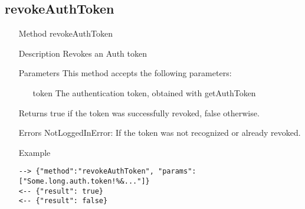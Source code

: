 \documentclass[a4paper]{scrreprt}
\begin{document}
\subsection{revokeAuthToken}
\begin{enumerate}
\item[Method] revokeAuthToken
\item[Description] Revokes an Auth token
\item[Parameters] This method accepts the following parameters:
	\begin{enumerate}
		\item[token] The authentication token, obtained with getAuthToken
    \end{enumerate}
\item[Returns] true if the token was successfully revoked, false otherwise.
\item[Errors] NotLoggedInError: If the token was not recognized or already revoked.
\item[Example]
\begin{lstlisting}
--> {"method":"revokeAuthToken", "params":["Some.long.auth.token!%&..."]}
<-- {"result": true}
<-- {"result": false}
\end{lstlisting}
\end{enumerate}

\clearpage
\end{document}
